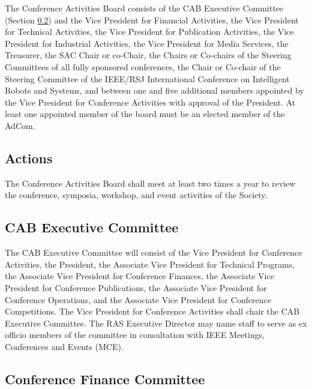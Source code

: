 \documentclass[10pt]{article}
\newcommand{\secref}[1]{Section \ref{#1}}
\begin{document}
The Conference Activities Board consists of the CAB Executive Committee (\secref{CAB:ExCom}) and the Vice President for Financial Activities, the Vice President for Technical Activities, the Vice President for Publication Activities,  the Vice President for Industrial Activities, the Vice President for Media Services, the Treasurer, the SAC Chair or co-Chair, the Chairs or Co-chairs of the Steering Committees of all fully sponsored conferences, the Chair or Co-chair of the Steering Committee of the IEEE/RSJ International Conference on Intelligent Robots and Systems, and between one and five additional members appointed by the Vice President for Conference Activities with approval of the President. At least one appointed member of the board must be an elected member of the AdCom.  

\subsection{Actions}

The Conference Activities Board shall meet at least two times a year to review the conference, symposia, workshop, and event activities of the Society.


\subsection{CAB Executive Committee}
\label{CAB:ExCom}

The CAB Executive Committee will consist of the Vice President for Conference Activities, the President, the Associate Vice President for Technical Programs, the Associate Vice President for Conference Finances, the Associate Vice President for Conference Publications, the Associate Vice President for Conference Operations, and the Associate Vice President for Conference Competitions. The Vice President for Conference Activities shall chair the CAB Executive Committee. The RAS Executive Director may name staff to serve as ex officio members of the committee in consultation with IEEE Meetings, Conferences and Events (MCE).


\subsection{Conference Finance Committee}
\end{document}
